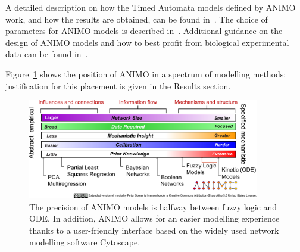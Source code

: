 \documentclass{bmcart}
\begin{document}
A detailed description on how the Timed Automata models defined by ANIMO work, and how the results are obtained,
can be found in~\cite{animo-ieee}. The choice of parameters for ANIMO models is described in~\cite{animo-syncop}.
Additional guidance on the design of ANIMO models and how to best profit from biological experimental data can be found in~\cite{animo-gene}.

Figure~\ref{fig:animo-spectrum} shows the position of ANIMO in a spectrum of modelling methods: justification for this placement is given in the Results section.



\begin{figure}[htbp]
 \begin{center}
  \includegraphics[width=0.9\textwidth]{images/modeling_methods_spectrum_animo}
 \end{center}
\caption{
The precision of ANIMO models is halfway between fuzzy logic and ODE. In addition, ANIMO
allows for an easier modelling experience thanks to a user-friendly interface based on
the widely used network modelling software Cytoscape.\label{fig:animo-spectrum}}
\end{figure}
\end{document}
